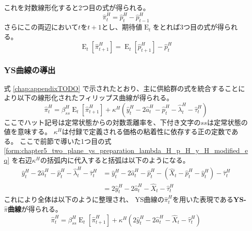 これを対数線形化すると2つ目の式が得られる。
\label{form:chapter3_policies_monetary_hat_pi_H_eq}
\begin{equation}
\label{form:chapter5_two_plane_ys_preparation_pi_H_eq}
    \hat{\pi}_t^H=\hat{p}_t^H-\hat{p}_{t-1}^H
\end{equation}
さらにこの両辺において\(t\)を\(t+1\)とし、期待値\(\operatorname{E}_t\)をとれば3つ目の式が得られる。
\begin{equation}
\label{form:chapter5_two_plane_ys_preparation_E_pi_H_eq}
    \operatorname{E}_t[\hat{\pi}_{t+1}^H]=\operatorname{E}_t[\hat{p}_{t+1}^H]-\hat{p}_t^H
\end{equation}

\subsubsection{YS曲線の導出}
\label{sec:chapter5_two_plane_ys_derivation}
式
\eqref{chap:appendixTODO}
で示されたとおり、主に供給群の式を統合することにより以下の線形化されたフィリップス曲線が得られる。
\begin{equation}
\label{form:chapter5_two_plane_ys_derivation_pi_H_eq}
\hat{\pi}_t^H=\beta_{ss}^H\operatorname{E}_t[\hat{\pi}_{t+1}^H]+\kappa^H(\hat{y}_t^H-2\hat{a}_t^H-\hat{p}_t^H-\hat{\lambda}_t^H-\hat{\tau}_t^H)
\end{equation}
ここでハット記号\(\hat{}\)は定常状態からの対数乖離率を、下付き文字の\(ss\)は定常状態の値を意味する。
\(\kappa^H\)は付録で定義される価格の粘着性に依存する正の定数である。
ここで前節で導いた1つ目の式
\eqref{form:chapter5_two_plane_ys_preparation_lambda_H_p_H_y_H_modified_eq}
を右辺\(\kappa^H\)の括弧内に代入すると括弧は以下のようになる。
\begin{equation}
\label{form:chapter5_two_plane_ys_derivation_pi_H_right_eq}
\begin{aligned}
    \hat{y}_t^H-2\hat{a}_t^H-\hat{p}_t^H-\hat{\lambda}_t^H-\hat{\tau}_t^H
    &=\hat{y}_t^H-2\hat{a}_t^H-\hat{p}_t^H-(\hat{X}_t-\hat{p}_t^H-\hat{y}_t^H)-\hat{\tau}_t^H \\
    &=2\hat{y}_t^H-2\hat{a}_t^H-\hat{X}_t-\hat{\tau}_t^H
\end{aligned}
\end{equation}
これにより全体は以下のように整理され、
YS曲線の\(\hat{\pi}_t^H\)を用いた表現である\textbf{YS-\(\hat{\pi}\)曲線}が得られる。
\begin{equation}
\label{form:chapter5_two_plane_ys_derivation_pi_H_modified_eq}
    \hat{\pi}_t^H=\beta_{ss}^H\operatorname{E}_t[\hat{\pi}_{t+1}^H]+\kappa^H(2\hat{y}_t^H-2\hat{a}_t^H-\hat{X}_t-\hat{\tau}_t^H)
\end{equation}
